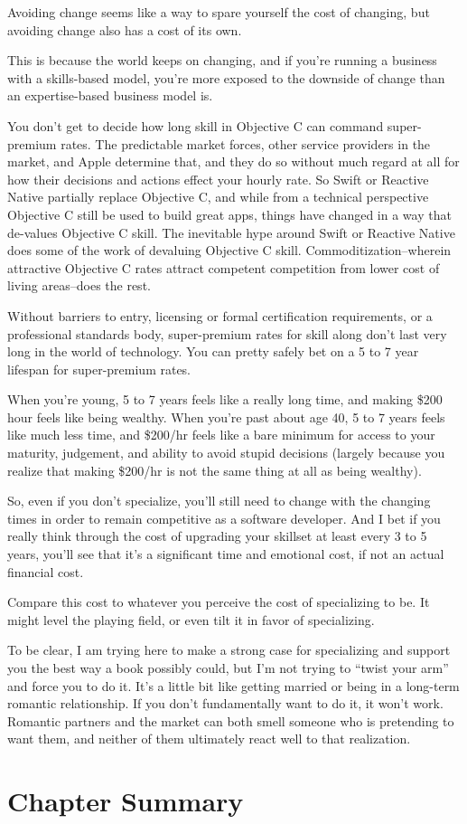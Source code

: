 Avoiding change seems like a way to spare yourself the cost of changing, but avoiding change also has a cost of its own.

This is because the world keeps on changing, and if you're running a business with a skills-based model, you're more exposed to the downside of change than an expertise-based business model is.

You don't get to decide how long skill in Objective C can command super-premium rates. The predictable market forces, other service providers in the market, and Apple determine that, and they do so without much regard at all for how their decisions and actions effect your hourly rate. So Swift or Reactive Native partially replace Objective C, and while from a technical perspective Objective C still be used to build great apps, things have changed in a way that de-values Objective C skill. The inevitable hype around Swift or Reactive Native does some of the work of devaluing Objective C skill. Commoditization--wherein attractive Objective C rates attract competent competition from lower cost of living areas--does the rest.

Without barriers to entry, licensing or formal certification requirements, or a professional standards body, super-premium rates for skill along don't last very long in the world of technology. You can pretty safely bet on a 5 to 7 year lifespan for super-premium rates.

When you're young, 5 to 7 years feels like a really long time, and making \$200 hour feels like being wealthy. When you're past about age 40, 5 to 7 years feels like much less time, and \$200/hr feels like a bare minimum for access to your maturity, judgement, and ability to avoid stupid decisions (largely because you realize that making \$200/hr is not the same thing at all as being wealthy).

So, even if you don't specialize, you'll still need to change with the changing times in order to remain competitive as a software developer. And I bet if you really think through the cost of upgrading your skillset at least every 3 to 5 years, you'll see that it's a significant time and emotional cost, if not an actual financial cost.

Compare this cost to whatever you perceive the cost of specializing to be. It might level the playing field, or even tilt it in favor of specializing.

To be clear, I am trying here to make a strong case for specializing and support you the best way a book possibly could, but I'm not trying to ``twist your arm'' and force you to do it. It's a little bit like getting married or being in a long-term romantic relationship. If you don't fundamentally want to do it, it won't work. Romantic partners and the market can both smell someone who is pretending to want them, and neither of them ultimately react well to that realization.

\section{Chapter Summary}